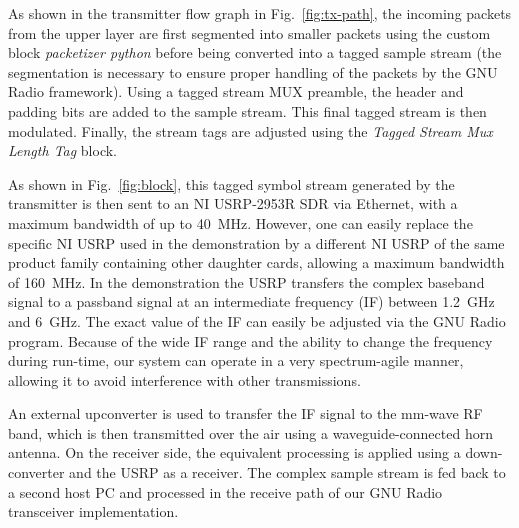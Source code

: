 \documentclass{sig-alternate}
\begin{document}
As shown in the transmitter flow graph in Fig.~\ref{fig:tx-path}, the incoming packets from the upper layer are first segmented into smaller packets using the custom block \textit{packetizer python} before being converted into a tagged sample stream (the segmentation is necessary to ensure proper handling of the packets by the GNU Radio framework).%
Using a tagged stream MUX preamble, the header and padding bits are added to the sample stream. %
This final tagged stream is then modulated. Finally, the stream tags are adjusted using the \textit{Tagged Stream Mux Length Tag} block.%

As shown in Fig.~\ref{fig:block}, this tagged symbol stream generated by the transmitter is then sent to an NI USRP-2953R \cite{ettus} SDR via Ethernet, with a maximum bandwidth of up to 40~MHz. However, one can easily replace the specific NI USRP used in the demonstration by a different NI USRP of the same product family containing other daughter cards, allowing a maximum bandwidth of 160~MHz. In the demonstration the USRP transfers the complex baseband signal to a passband signal at an intermediate frequency (IF) between 1.2~GHz and 6~GHz. The exact value of the IF can easily be adjusted via the GNU Radio program. Because of the wide IF range and the ability to change the frequency during run-time, our system can operate in a very spectrum-agile manner, allowing it to avoid interference with other transmissions.

An external upconverter \cite{siversima} is used to transfer the IF signal to the mm-wave RF band, which is then transmitted over the air using a waveguide-connected horn antenna. On the receiver side, the equivalent  processing is applied using a down-converter and the USRP as a receiver. The complex sample stream is fed back to a second host PC and processed in the receive path of our GNU Radio transceiver implementation.
\end{document}
